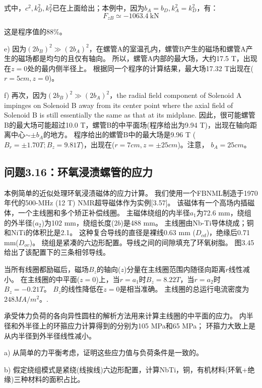 式中，$c^2, k_D^2,k_T^2$已在上面给出；本例中，因为$b_A=b_D, k_A^2=k_D^2$，有：
\begin{equation}
F_{zB}\simeq -1063.4\ \mathrm{kN}
\end{equation}

这是程序值的88\%。

e) 因为$(2b_B)^2\gg (2b_A)^2$，在螺管A的室温孔内，螺管B产生的磁场和螺管A产生的磁场都是均匀的且仅有轴向。
所以，螺管A内部的最大场，大约17.5 T，出现在$z=0$处的最内侧半径上。
根据同一个程序的计算结果，最大场17.32 T出现在($r=5 cm,z=0$)。

f) 再次，因为$(2b_B)^2\gg (2b_A)^2$，the radial field component of Solenoid A impinges on Solenoid B away from its center point where the axial field of Solenoid B is still essentially the same as that at its midplane. 因此，很可能螺管B的最大场可能超过10.0 T，螺管B的中平面场(程序给出为9.94 T)，出现在轴向距离中心$\sim \pm b_A$的地方。
程序给出的螺管B中的最大场是9.96 T ($B_r = \pm 1.70 T;B_z =9.81 T$)，出现在($r=7 cm, z=\pm 25 cm$)。注意，
$b_A=25 cm$。
\newpage


\subsection{问题3.16：环氧浸渍螺管的应力}
本例简单的近似处理环氧浸渍磁体的应力计算。
我们使用一个FBNML制造于1970年代的500-MHz (12 T) NMR超导磁体作为实例[3.57]。
该磁体有一个高场内插磁体，一个主线圈和多个矫正补偿线圈。
主磁体绕组的内半径$a_1$为72.6 mm，绕组的外半径($a_2$)为102 mm，绕组长度($2b$)是488 mm。
主线圈由Nb-Ti导体绕成；铜和NiTi的体积比是2.1。
这种复合导线的直径是裸线0.63 mm ($D_{cd}$)，绝缘后0.71 mm($D_{ov}$)。
绕组是紧凑的六边形配置。导线之间的间隙填充了环氧树脂。
图3.45给出了该配置下的三条相邻导线。

当所有线圈都励磁后，磁场$B_z$的轴向($z$)分量在主线圈范围内随径向距离$r$线性减小。
在主线圈的中平面($z = 0$)上，当$r = a_1$时$B_z=8.22T$，当$r = a_2$时$B_z=-0.21T$。
$B_z$的线性降低在$z=0$是相当准确。
主线圈的总运行电流密度为$248 MA/m^2$。.

承受体力负荷的各向异性圆柱的解析方法用来计算主线圈的中平面的应力。
内半径和外半径上的环箍应力计算得到的分别为105 MPa和65 MPa；
环箍力大致上是从内半径到外半径线性减小。

a) 从简单的力平衡考虑，证明这些应力值与负荷条件是一致的。

b) 假定绕组模式是紧绕(线挨线)六边形配置，计算NbTi，铜，有机材料(环氧+绝缘)三种材料的面积占比。

